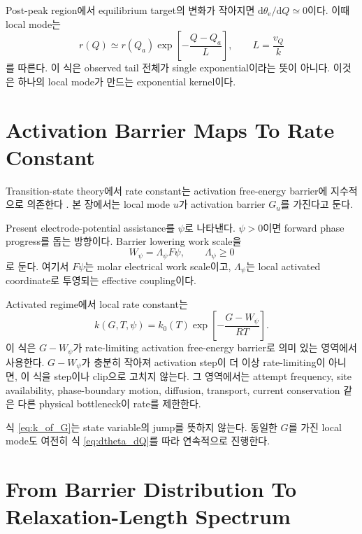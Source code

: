 \documentclass[11pt,a4paper]{article}
\newcommand{\dd}{\mathrm{d}}
\begin{document}
Post-peak region에서 equilibrium target의 변화가 작아지면 \(\dd\theta_{\mathrm e}/\dd Q\simeq0\)이다. 이때 local mode는
\begin{equation}
r(Q)\simeq r(Q_a)\exp\!\left[-\frac{Q-Q_a}{L}\right],
\qquad
L=\frac{v_Q}{k}
\label{eq:local_kernel}
\end{equation}
를 따른다. 이 식은 observed tail 전체가 single exponential이라는 뜻이 아니다. 이것은 하나의 local mode가 만드는 exponential kernel이다.

\section{Activation Barrier Maps To Rate Constant}

Transition-state theory에서 rate constant는 activation free-energy barrier에 지수적으로 의존한다 \cite{Eyring1935,EyringChemRev1935}. 본 장에서는 local mode \(u\)가 activation barrier \(G_u\)를 가진다고 둔다.

Present electrode-potential assistance를 \(\psi\)로 나타낸다. \(\psi>0\)이면 forward phase progress를 돕는 방향이다. Barrier lowering work scale을
\begin{equation}
W_\psi=\Lambda_\psi F\psi,
\qquad
\Lambda_\psi\ge0
\label{eq:work}
\end{equation}
로 둔다. 여기서 \(F\psi\)는 molar electrical work scale이고, \(\Lambda_\psi\)는 local activated coordinate로 투영되는 effective coupling이다.

Activated regime에서 local rate constant는
\begin{equation}
\boxed{
k(G,T,\psi)
=
k_0(T)
\exp\!\left[
-\frac{G-W_\psi}{RT}
\right].
}
\label{eq:k_of_G}
\end{equation}
이 식은 \(G-W_\psi\)가 rate-limiting activation free-energy barrier로 의미 있는 영역에서 사용한다. \(G-W_\psi\)가 충분히 작아져 activation step이 더 이상 rate-limiting이 아니면, 이 식을 step이나 clip으로 고치지 않는다. 그 영역에서는 attempt frequency, site availability, phase-boundary motion, diffusion, transport, current conservation 같은 다른 physical bottleneck이 rate를 제한한다.

식 \eqref{eq:k_of_G}는 state variable의 jump를 뜻하지 않는다. 동일한 \(G\)를 가진 local mode도 여전히 식 \eqref{eq:dtheta_dQ}를 따라 연속적으로 진행한다.

\section{From Barrier Distribution To Relaxation-Length Spectrum}
\end{document}
